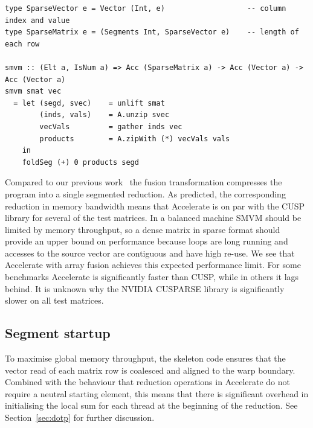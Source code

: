 \begin{lstlisting}[style=haskell
    ,float
    ,label=lst:smvm
    ,caption={Sparse-matrix vector multiplication}]
type SparseVector e = Vector (Int, e)                   -- column index and value
type SparseMatrix e = (Segments Int, SparseVector e)    -- length of each row

smvm :: (Elt a, IsNum a) => Acc (SparseMatrix a) -> Acc (Vector a) -> Acc (Vector a)
smvm smat vec
  = let (segd, svec)    = unlift smat
        (inds, vals)    = A.unzip svec
        vecVals         = gather inds vec
        products        = A.zipWith (*) vecVals vals
    in
    foldSeg (+) 0 products segd
\end{lstlisting}

Compared to our previous work~\cite{Chakravarty:2011fr} the fusion
transformation compresses the program into a single segmented reduction. As
predicted, the corresponding reduction in memory bandwidth means that Accelerate
is on par with the CUSP library for several of the test matrices. In a balanced
machine SMVM should be limited by memory throughput, so a dense matrix in
sparse format should provide an upper bound on performance because loops are
long running and accesses to the source vector are contiguous and have high
re-use. We see that Accelerate with array fusion achieves this expected
performance limit. For some benchmarks Accelerate is significantly faster than
CUSP, while in others it lags behind. It is unknown why the NVIDIA
CUSPARSE library is significantly slower on all test matrices.

\subsection{Segment startup}

To maximise global memory throughput, the skeleton code ensures that the vector
read of each matrix row is coalesced and aligned to the warp boundary. Combined
with the behaviour that reduction operations in Accelerate do not require a
neutral starting element, this means that there is significant overhead in
initialising the local sum for each thread at the beginning of the reduction.
See Section~\ref{sec:dotp} for further discussion.


